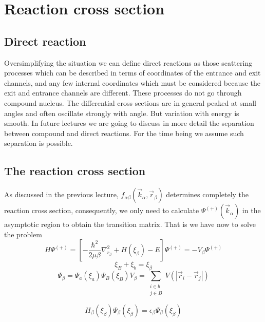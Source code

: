 \documentclass[a4paper,14pt]{book}
\begin{document}
 \setcounter{chapter}{3}
 \chapter{Reaction cross section}
\section{Direct reaction}
Oversimplifying the situation we can define direct reactions as those scattering processes which can be described in terms of coordinates of the entrance and exit channels, and any few internal coordinates which must be considered because the exit and entrance channels are different. These processes do not go through compound nucleus. The differential cross sections are in general peaked at small angles and often oscillate strongly with angle. But variation with energy is smooth. In future lectures we are going to discuss in more detail the separation between compound and direct reactions. For the time being we assume such separation is possible.
\section{The reaction cross section}
As discussed in the previous lecture, $f_{\alpha \beta}(\vec{k}_\alpha, \vec{r}_\beta)$ determines completely the reaction cross section, consequently, we only need to calculate $\Psi^{(+)}(\vec{k}_\alpha)$ in the asymptotic region to obtain the transition matrix. That is we have now to solve the problem
\begin{equation}\label{eq1}
 H\Psi^{(+)}=\left[ -\frac{\hbar^2}{2\mu \beta} \nabla^2_{r_ \beta}+ H(\xi_\beta)-E\right] \Psi^{(+)}=-V_\beta \Psi^{(+)}
\end{equation}
\begin{equation}\label{eq2}
\xi_B+\xi_b=\xi_\beta
\end{equation}
\begin{subequations}
 \begin{equation}\label{eq3a}
\Psi_ \beta=\Psi_ a(\xi_a)\Psi_ B(\xi_B)
\end{equation}

\begin{equation}\label{eq3b}
V_\beta=\sum_{\substack{i\in b \\ j\in B}} V(|\vec{r}_i-\vec{r}_j|)
\end{equation}
\end{subequations}

\begin{equation}\label{eq4}
H_\beta(\xi_\beta)\Psi_ \beta(\xi_\beta)=\epsilon_ \beta\Psi_ \beta(\xi_\beta)
\end{equation}
\end{document}
